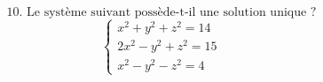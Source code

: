 \documentclass{article}
\begin{document}
\[
\text{10. Le système suivant possède-t-il une solution unique ?}
\]
\[
\begin{cases}
x^2 + y^2 + z^2 = 14 \\
2x^2 - y^2 + z^2 = 15 \\
x^2 - y^2 - z^2 = 4
\end{cases}
\]
\end{document}
